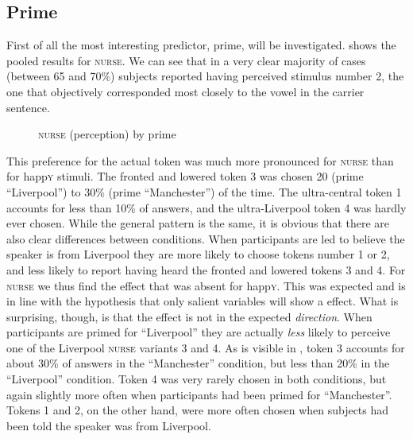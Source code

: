 \subsection{Prime}
\label{sec.perc_res.nurse.prime}

First of all the most interesting predictor, prime, will be investigated.
 shows the pooled results for \textsc{nurse}.
We can see that in a very clear majority of cases (between 65 and 70\%) subjects reported having perceived stimulus number 2, the one that objectively corresponded most closely to the vowel in the carrier sentence.

\begin{figure}
	
		\resizebox{.49\linewidth}{!}{} 
	\caption{\textsc{nurse} (perception) by prime}
	\label{fig.bar.nurse.tot.ext}
\end{figure}

This preference for the actual token was much more pronounced for \textsc{nurse} than for happ\textsc{y} stimuli.
The fronted and lowered token 3 was chosen 20 (prime ``Liverpool'') to 30\% (prime ``Manchester'') of the time.
The ultra-central token 1 accounts for less than 10\% of answers, and the ultra-Liverpool token 4 was hardly ever chosen.
While the general pattern is the same, it is obvious that there are also clear differences between  conditions.
When participants are led to believe the speaker is from Liverpool they are more likely to choose tokens number 1 or 2, and less likely to report having heard the fronted and lowered tokens 3 and 4.
For \textsc{nurse} we thus find the  effect that was absent for happ\textsc{y}.
This was expected and is in line with the hypothesis that only salient variables will show a  effect.
What is surprising, though, is that the  effect is not in the expected \emph{direction}.
When participants are primed for ``Liverpool'' they are actually \emph{less} likely to perceive one of the Liverpool \textsc{nurse} variants 3 and 4.
As is visible in , token 3 accounts for about 30\% of answers in the ``Manchester'' condition, but less than 20\% in the ``Liverpool'' condition.
Token 4 was very rarely chosen in both conditions, but again slightly more often when participants had been primed for ``Manchester''.
Tokens 1 and 2, on the other hand, were more often chosen when subjects had been told the speaker was from Liverpool.

